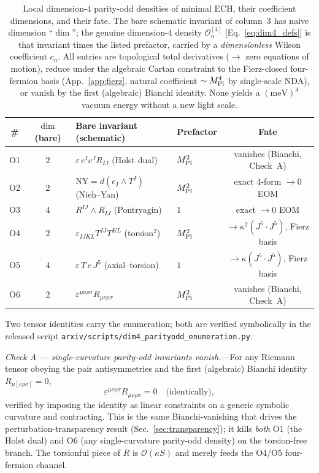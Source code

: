 \documentclass[aps,prd,twocolumn,superscriptaddress,showpacs,preprintnumbers,nofootinbib,longbibliography,floatfix]{revtex4-2}
\newcommand{\MPl}{M_{\rm Pl}}
\begin{document}
\begin{table}[t]
\caption{Local dimension-$4$ parity-odd densities of minimal ECH, their
coefficient dimensions, and their fate. The bare schematic invariant of
column~3 has naive dimension ``$\dim$''; the genuine dimension-$4$ density
$\mathcal{O}_n^{[4]}$ [Eq.~\eqref{eq:dim4_defs}] is that invariant times the
listed prefactor, carried by a \emph{dimensionless} Wilson coefficient $c_n$.
All entries are topological total derivatives ($\to$ zero equations of
motion), reduce under the algebraic Cartan constraint to the Fierz-closed
four-fermion basis (App.~\ref{app:fierz}, natural coefficient $\sim\MPl^4$
by single-scale NDA), or vanish by the first (algebraic) Bianchi identity.
None yields a $(\text{meV})^4$ vacuum energy without a new light scale.}
\label{tab:dim4_parityodd}
\begin{ruledtabular}
\begin{tabular}{ccllc}
\# & $\dim$ (bare) & Bare invariant (schematic) & Prefactor & Fate \\
\hline
O1 & $2$ & $\varepsilon\,e^I e^J R_{IJ}$ (Holst dual) & $\MPl^{2}$ & vanishes (Bianchi, Check~A) \\
O2 & $2$ & $\mathrm{NY}=d(e_I\wedge T^I)$ (Nieh--Yan) & $\MPl^{2}$ & exact 4-form $\to0$ EOM \\
O3 & $4$ & $R^{IJ}\wedge R_{IJ}$ (Pontryagin) & $1$ & exact $\to0$ EOM \\
O4 & $2$ & $\varepsilon_{IJKL}T^{IJ}T^{KL}$ (torsion$^2$) & $\MPl^{2}$ & $\to\kappa^2(J^5\!\cdot\!J^5)$, Fierz basis \\
O5 & $4$ & $\varepsilon\,T\,e\,J^5$ (axial--torsion) & $1$ & $\to\kappa(J^5\!\cdot\!J^5)$, Fierz basis \\
O6 & $2$ & $\varepsilon^{\mu\nu\rho\sigma}R_{\mu\nu\rho\sigma}$ & $\MPl^{2}$ & vanishes (Bianchi, Check~A) \\
\end{tabular}
\end{ruledtabular}
\end{table}

Two tensor identities carry the enumeration; both are verified symbolically
in the released script
\texttt{arxiv/scripts/dim4\_parityodd\_enumeration.py}.

\textit{Check A --- single-curvature parity-odd invariants vanish.}---For any
Riemann tensor obeying the pair antisymmetries and the first (algebraic)
Bianchi identity $R_{\mu[\nu\rho\sigma]}=0$,
\begin{equation}
\varepsilon^{\mu\nu\rho\sigma}R_{\mu\nu\rho\sigma}=0
\quad\text{(identically)},
\label{eq:dim4_bianchi_vanish}
\end{equation}
verified by imposing the identity as linear constraints on a generic
symbolic curvature and contracting. This is the same Bianchi-vanishing that
drives the perturbation-transparency result (Sec.~\ref{sec:transparency});
it kills \emph{both} O1 (the Holst dual) and O6 (any single-curvature
parity-odd density) on the torsion-free branch. The torsionful piece of $R$
is $\mathcal{O}(\kappa S)$ and merely feeds the O4/O5 four-fermion channel.
\end{document}
